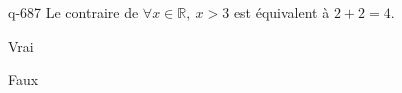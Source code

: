 \begin{truefalse}{q-687}
Le contraire de $\forall x \in \mathbb R,\: x>3$ est équivalent à $2+2=4$.
\item* Vrai
\item Faux
\end{truefalse}

